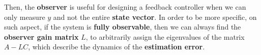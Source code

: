 Then, the \textbf{observer} is useful for  designing a feedback controller when we can only measure $y$ and not the entire \textbf{state vector}.
In order to be more specific, on such aspect, if the system is \textbf{fully observable}, then we can always find the \textbf{observer gain matrix} $L$, to arbitrarily assign the eigenvalues of the matrix $A-LC$, which describe the dynamics of the \textbf{estimation error}. \\

\hspace*{-5mm}
%

